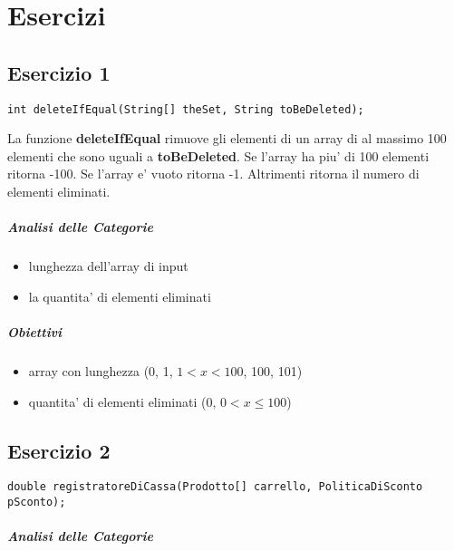 \chapter{Esercizi}

\section{Esercizio 1}

\begin{verbatim}
int deleteIfEqual(String[] theSet, String toBeDeleted);
\end{verbatim}

La funzione \textbf{deleteIfEqual} rimuove gli elementi di un array di al massimo 100 elementi che sono uguali a \textbf{toBeDeleted}.
Se l'array ha piu' di 100 elementi ritorna -100. Se l'array e' vuoto ritorna -1. Altrimenti ritorna il numero di elementi eliminati.

\paragraph{Analisi delle Categorie}

\begin{itemize}
  \item lunghezza dell'array di input
  \item la quantita' di elementi eliminati
\end{itemize}

\paragraph{Obiettivi}

\begin{itemize}
  \item array con lunghezza (0, 1, $1 < x < 100$, 100, 101)
  \item quantita' di elementi eliminati (0, $0 < x \leq 100$)
\end{itemize}

\section{Esercizio 2}

\begin{verbatim}
double registratoreDiCassa(Prodotto[] carrello, PoliticaDiSconto pSconto);
\end{verbatim}

\paragraph{Analisi delle Categorie}

